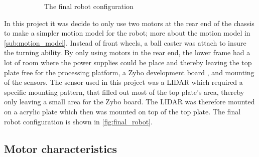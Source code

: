 \documentclass[Main]{subfiles}
\begin{document}
\begin{figure}[H]
\begin{subfigure}[b]{0.4\linewidth}
		\caption{The final robot configuration}
		\label{fig:final_robot}
	\end{subfigure}
\caption{}
\label{fig:motion_models}
\end{figure}
In this project it was decide to only use two motors at the rear end of the chassis to make a simpler motion model for the robot; more about the motion model in \autoref{sub:motion_model}. 
Instead of front wheels, a ball caster was attach to insure the turning ability. 
By only using motors in the rear end, the lower frame had a lot of room where the power supplies could be place and thereby leaving the top plate free for the processing platform, a Zybo development board , and mounting of the sensors. 
The sensor used in this project was a LIDAR  which required a specific mounting pattern, that filled out most of the top plate's area, thereby only leaving a small area for the Zybo board. 
The LIDAR was therefore mounted on a acrylic plate which then was mounted on top of the top plate. 
The final robot configuration is shown in \autoref{fig:final_robot}.

	\subsection{Motor characteristics} %
		\label{sub:motor_characteristics}
		
\end{document}

